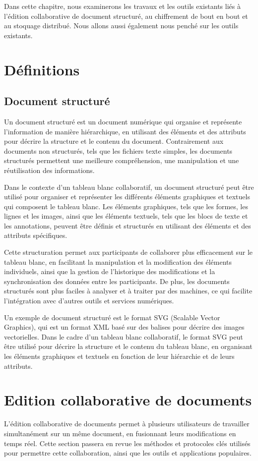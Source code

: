Dans cette chapitre, nous examinerons les travaux et les outils existants liés à l'édition collaborative de document structuré, au chiffrement de bout en bout et au stoquage distribué.
Nous allons aussi également nous penché sur les outils existants.

\section{Définitions}

\subsection{Document structuré}
Un document structuré est un document numérique qui organise et représente l'information de manière hiérarchique, en utilisant des éléments et des attributs pour décrire la structure et le contenu du document. Contrairement aux documents non structurés, tels que les fichiers texte simples, les documents structurés permettent une meilleure compréhension, une manipulation et une réutilisation des informations.

Dans le contexte d'un tableau blanc collaboratif, un document structuré peut être utilisé pour organiser et représenter les différents éléments graphiques et textuels qui composent le tableau blanc. Les éléments graphiques, tels que les formes, les lignes et les images, ainsi que les éléments textuels, tels que les blocs de texte et les annotations, peuvent être définis et structurés en utilisant des éléments et des attributs spécifiques.

Cette structuration permet aux participants de collaborer plus efficacement sur le tableau blanc, en facilitant la manipulation et la modification des éléments individuels, ainsi que la gestion de l'historique des modifications et la synchronisation des données entre les participants. De plus, les documents structurés sont plus faciles à analyser et à traiter par des machines, ce qui facilite l'intégration avec d'autres outils et services numériques.

Un exemple de document structuré est le format SVG (Scalable Vector Graphics), qui est un format XML basé sur des balises pour décrire des images vectorielles. Dans le cadre d'un tableau blanc collaboratif, le format SVG peut être utilisé pour décrire la structure et le contenu du tableau blanc, en organisant les éléments graphiques et textuels en fonction de leur hiérarchie et de leurs attributs.


\section{Edition collaborative de documents}
L'édition collaborative de documents permet à plusieurs utilisateurs de travailler simultanément sur un même document, en fusionnant leurs modifications en temps réel.
Cette section passera en revue les méthodes et protocoles clés utilisés pour permettre cette collaboration, ainsi que les outils et applications populaires.

